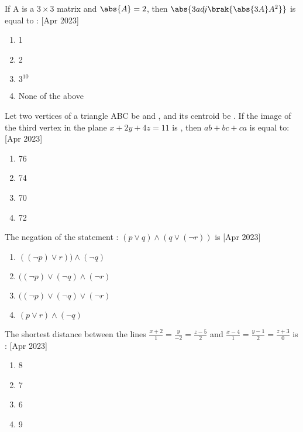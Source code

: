     \item If A is a $3\times 3$ matrix and $\abs{A}=2$, then $\abs{3adj\brak{\abs{3A}A^{2}}}$ is equal to :
     \hfill{[Apr 2023]}
		\begin{multicols}{1}
			\begin{enumerate}
				\item 1
    \item 2
    \item $3^{10}$
    \item None of the above
			\end{enumerate}
		\end{multicols}

    \item Let two vertices of a triangle ABC be  and , and its centroid be . If the image of the third vertex in the plane $x+2y+4z=11$ is , then $ab+bc+ca$ is equal to:
     \hfill{[Apr 2023]}
		\begin{multicols}{1}
			\begin{enumerate}

				\item 76
    \item 74
     \item 70
      \item 72
			\end{enumerate}
		\end{multicols}

    \item The negation of the statement : $(p \lor q) \land (q \lor (\neg r))$ is
     \hfill{[Apr 2023]}
    \begin{multicols}{1}
            \begin{enumerate}
              \item $((\neg p) \lor r)) \land (\neg q)$
              \item  $((\neg p) \lor (\neg q) \land(\neg r)$
              \item  $((\neg p) \lor (\neg q) \lor(\neg r)$
              \item $(p \lor r) \land  (\neg q)$
            \end{enumerate}
        \end{multicols}
    \item The shortest distance between the lines $\frac{x+2}{1}=\frac{y}{-2}=\frac{z-5}{2} $ and $\frac{x-4}{1}=\frac{y-1}{2}=\frac{z+3}{0}$ is :
     \hfill{[Apr 2023]}
    \begin{multicols}{1}
            \begin{enumerate}
              \item 8
              \item  7
              \item  6
              \item 9
            \end{enumerate}
        \end{multicols}

